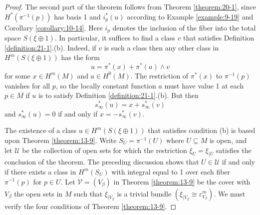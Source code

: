 \begin{proof}
  The second part of the theorem follows from Theorem \ref{theorem:20-1}, since ${H}^*( {{\pi }^{-1}( p) })$ has basis 1
  and ${i}_{p}^*( u)$ according to Example \ref{example:9-19} and Corollary \ref{corollary:10-14}. Here ${i}_{p}$ denotes 
  the inclusion of the fiber into the total space $S( {\xi  \oplus  1})$. In particular, it suffices to find a class $v$ that 
  satisfies Definition \ref{definition:21-1}.(b). Indeed, if $v$ is such a class then any other class in $H^m( {S( {\xi  \oplus  1}) })$ 
  has the form
  \[
    u = {\pi }^*( x)  + {\pi }^*( a)  \land  v
  \]
  for some $x \in  H^m( M)$ and $a \in  {H}^{0}( M)$. The restriction of ${\pi }^*( x)$ to ${\pi }^{-1}( p)$ 
  vanishes for all $p$, so the locally constant function $a$ must have value 1 at each $p \in  M$ if $u$ is to satisfy 
  Definition \ref{definition:21-1}.(b). But then
  \[
    {s}_{\infty }^*( u)  = x + {s}_{\infty }^*( v)
  \]
  and ${s}_{\infty }^*( u)  = 0$ if and only if $x = - {s}_{\infty }^*( v)$.
  
  The existence of a class $u \in  H^m( {S( {\xi  \oplus  1}) })$ that satisfies condition (b) is based upon 
  Theorem \ref{theorem:13-9}. Write ${S}_{U} = {\pi }^{-1}( U)$ where $U \subseteq  M$ is open, and let $\mathcal{U}$ 
  be the collection of open sets for which the restriction ${\xi }_{U} = {\xi }_{\mid U}$ satisfies the conclusion
  of the theorem. The preceding discussion shows that $U \in  \mathcal{U}$ if and only if there exists a class 
  in $H^m( {S}_{U})$ with integral equal to 1 over each fiber ${\pi }^{-1}( p)$ for $p \in  U$. Let $\mathcal{V} = ( {V}_{\beta })$ 
  in Theorem \ref{theorem:13-9} be the cover with ${V}_{\beta }$ the open sets in $M$ such that ${\xi }_{\mid {V}_{\beta }}$ is a 
  trivial bundle $( {{\xi }_{\mid {V}_{\beta }} \cong  {\varepsilon }_{{V}_{\beta }}^{m}})$. We must verify the four 
  conditions of Theorem \ref{theorem:13-9}.


\end{proof}
